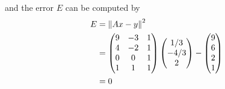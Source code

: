 \begin{homeworkProblem}
\begin{enumerate}[label=(\roman*)]
\[        \]
        and the error $E$ can be computed by
        \[
        \begin{aligned}
            E &= \left\lVert Ax-y \right\rVert^2 \\
            &= \begin{pmatrix}
                9 & -3 & 1 \\
                4 & -2 & 1 \\
                0 & 0 & 1 \\
                1 & 1 & 1
            \end{pmatrix} \begin{pmatrix}
                1/3 \\ -4/3 \\ 2
            \end{pmatrix} - \begin{pmatrix}
                9 \\ 6 \\ 2 \\ 1
            \end{pmatrix}\\
            &= 0
        \end{aligned}
        \]
\end{enumerate}

\end{homeworkProblem}
